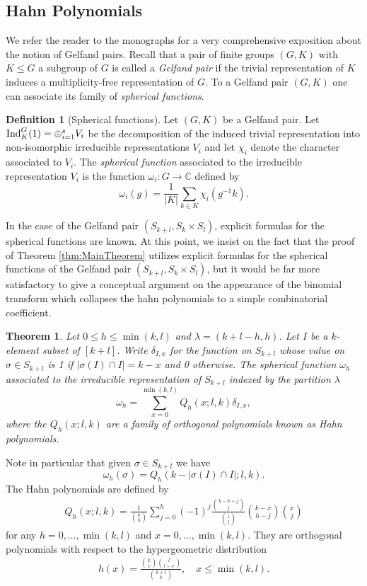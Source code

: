 \documentclass[11pt, a4paper, oneside, reqno]{amsart}
\newtheorem*{theorem*}{Theorem}
\theoremstyle{remark}
\theoremstyle{definition}
\newtheorem{definition}[theorem]{Definition}
\numberwithin{equation}{section}
\begin{document}
\subsection{Hahn Polynomials}
\label{sec:HahnPoly} We refer the reader to the monographs \cite{ceccherini1945harmonic,ceccherini1945harmonic} for a very comprehensive exposition about the notion of Gelfand pairs.
Recall that a pair of finite groups $(G,K)$ with $K \leqslant G$ a subgroup of $G$ is called a {\it{Gelfand pair}} if the trivial representation of $K$ induces a multiplicity-free representation of $G$. 
To a Gelfand pair $(G,K)$ one can associate its family of {\it spherical functions}.
\begin{definition}[Spherical functions]
	Let $(G,K)$ be a Gelfand pair. Let ${\rm Ind}_K^G(1) = \oplus_{i = 1 }^s V_i$ be the decomposition of the induced trivial representation into non-isomorphic irreducible representations $V_i$ and let $\chi_i$ denote the character associated to $V_i$. The {\it spherical function} associated to the irreducible representation $V_i$ is the function $\omega_i : G \to \mathbb{C}$ defined by
	$$
		\omega_i(g) = \frac{1}{|K|}\sum_{k \in K} \chi_i(g^{-1}k).
	$$
\end{definition}
In the case of the Gelfand pair $(S_{k+l}, S_k \times S_l)$, explicit formulas for the spherical functions are known. At this point, we insist on the fact that the proof of Theorem \ref{thm:MainTheorem} utilizes explicit formulas for the spherical functions of the Gelfand pair $(S_{k+l}, S_k \times S_l)$, but it would be far more satisfactory to give a conceptual argument on the appearance of the binomial transform which collapses the hahn polynomials to a simple combinatorial coefficient. 
\begin{theorem*}\cite[Theorem 6.2.3, Remark 6.2.4] {ceccherini1945harmonic}
	Let $0\leq h\leq \min(k,l)$ and $\lambda = (k+l-h,h)$. Let $I$ be a $k$-element subset of $[k+l]$. Write $\delta_{I,x}$ for the function on $S_{k+l}$ whose value on $\sigma \in S_{k+l}$ is 1 if $|\sigma(I) \cap I| = k-x$ and 0 otherwise. The spherical function $\omega_h$ associated to the irreducible representation of $S_{k+l}$ indexed by the partition $\lambda$ 
	\begin{equation*}
		\omega_h = \sum_{x=0}^{\min(k,l)} Q_h(x;l,k) \delta_{I,x},
	\end{equation*}
	where the $Q_h(x;l,k)$ are a family of orthogonal polynomials known as {\rm Hahn polynomials}.
\end{theorem*}
Note in particular that given $\sigma \in S_{k+l}$ we have
$$
	\omega_h(\sigma) = Q_h(k-|\sigma(I) \cap I|;l,k).
$$
The Hahn polynomials are defined by
\begin{align*}
	Q_h(x;l,k) = \frac{1}{\binom{k}{h}} \sum_{j=0}^h (-1)^j \frac{\binom{k-h+j}{j}}{\binom{l}{j}} \binom{k-x}{h-j} \binom{x}{j}
\end{align*}
for any $h = 0,\ldots,\min(k,l)$ and $x = 0,\ldots,\min(k,l)$. They are orthogonal polynomials with respect to the hypergeometric distribution
\begin{align*}
	h(x)= \frac{\binom{k}{x}\binom{l}{l-x}}{\binom{k+l}{k}},\quad x \leq \min(k,l).
\end{align*}
\end{document}
